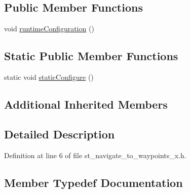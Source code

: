 \subsection*{Public Member Functions}
\begin{DoxyCompactItemize}
\item 
void \hyperlink{structsm__dance__bot__3_1_1StNavigateToWaypointsX_a48efc83147f7eb457e4a7f041029aef4}{runtime\+Configuration} ()
\end{DoxyCompactItemize}
\subsection*{Static Public Member Functions}
\begin{DoxyCompactItemize}
\item 
static void \hyperlink{structsm__dance__bot__3_1_1StNavigateToWaypointsX_a141197b232cd59846486861ebadd147e}{static\+Configure} ()
\end{DoxyCompactItemize}
\subsection*{Additional Inherited Members}


\subsection{Detailed Description}


Definition at line 6 of file st\+\_\+navigate\+\_\+to\+\_\+waypoints\+\_\+x.\+h.



\subsection{Member Typedef Documentation}
